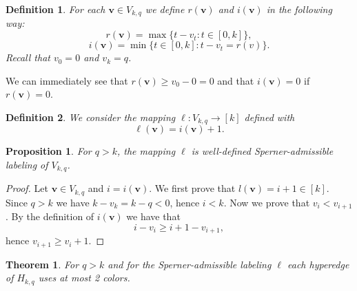 \documentclass[12pt]{article}
\newtheorem{theorem}{Theorem}
\newtheorem{proposition}{Proposition}
\newtheorem{definition}{Definition}
\begin{document}
\begin{definition}For each $\bm{v}\in V_{k,q}$ we define $r(\bm{v})$ and $i(\bm{v})$ in the following way:
\[r(\bm{v})=\max\{t-v_t:t\in[0,k]\},\]
\[i(\bm{v})=\min\{t\in[0,k]:t-v_t=r(v)\}.\]
Recall that $v_0=0$ and $v_k=q$.
\end{definition}

We can immediately see that $r(\bm{v})\geq v_0-0=0$ and that $i(\bm{v})=0$ if $r(\bm{v})=0$.\\

\begin{definition} We consider the mapping $\ell:V_{k,q}\to[k]$ defined with
\[\ell(\bm{v})=i(\bm{v})+1.\]
\end{definition}

\begin{proposition}
For $q>k$, the mapping $\ell$ is well-defined Sperner-admissible labeling of $V_{k,q}$.
\end{proposition}

\begin{proof} Let $\bm{v}\in V_{k,q}$ and $i=i(\bm{v})$. We first prove that $l(\bm{v})=i+1\in[k]$. Since $q>k$ we have $k-v_k=k-q<0$, hence $i<k$. Now we prove that $v_i<v_{i+1}$. By the definition of $i(\bm{v})$ we have that
\[i-v_i\geq i+1-v_{i+1},\]
hence $v_{i+1}\geq v_i+1$.
\end{proof}

\begin{theorem}
For $q>k$ and for the Sperner-admissible labeling $\ell$ each hyperedge of $H_{k,q}$ uses at most 2 colors. 
\end{theorem}
\end{document}
